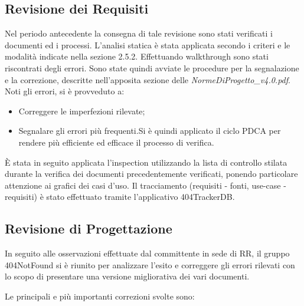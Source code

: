 \subsection{Revisione dei Requisiti}
Nel periodo antecedente la consegna di tale revisione sono stati verificati i documenti ed i processi.
L'analisi statica è stata applicata secondo i criteri e le modalità indicate nella sezione 2.5.2. Effettuando walkthrough sono stati riscontrati degli errori. Sono state quindi avviate le procedure per la segnalazione e la correzione, descritte nell'apposita sezione delle \textit{NormeDiProgetto\_v4.0.pdf}.
Noti gli errori, si è provveduto a:
\begin{itemize}
	\item Correggere le imperfezioni rilevate;
	\item Segnalare gli errori più frequenti.Si è quindi applicato il ciclo PDCA per rendere più efficiente ed efficace il processo di verifica.
\end{itemize}
È stata in seguito applicata l'inspection utilizzando la lista di controllo stilata durante la verifica dei documenti precedentemente verificati, ponendo particolare attenzione ai grafici dei casi d'uso.
Il tracciamento (requisiti - fonti, use-case - requisiti) è stato effettuato tramite l'applicativo 404TrackerDB.
\newpage
\subsection{Revisione di Progettazione}
In seguito alle osservazioni effettuate dal committente in sede di RR, il gruppo 404NotFound si è riunito per analizzare l'esito e correggere gli errori rilevati con lo scopo di presentare una versione migliorativa dei vari documenti.

Le principali e più importanti correzioni svolte sono:

